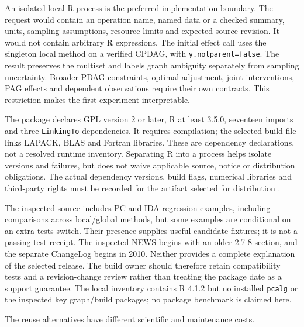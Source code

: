 An isolated local R process is the preferred implementation boundary.
The request would contain an operation name, named data or a checked
summary, units, sampling assumptions, resource limits and expected
source revision. It would not contain arbitrary R expressions. The
initial effect call uses the singleton local method on a verified CPDAG,
with \texttt{y.notparent=false}. The result preserves the multiset and
labels graph ambiguity separately from sampling uncertainty. Broader
PDAG constraints, optimal adjustment, joint interventions, PAG effects
and dependent observations require their own contracts. This restriction
makes the first experiment interpretable.

The package declares GPL version 2 or later, R at least 3.5.0, seventeen
imports and three \texttt{LinkingTo} dependencies. It requires
compilation; the selected build file links LAPACK, BLAS and Fortran
libraries. These are dependency declarations, not a resolved runtime
inventory. Separating R into a process helps isolate versions and
failures, but does not waive applicable source, notice or distribution
obligations. The actual dependency versions, build flags, numerical
libraries and third-party rights must be recorded for the artifact
selected for distribution \citep{exec13_pcalg_reuse_primary}.

The inspected source includes PC and IDA regression examples, including
comparisons across local/global methods, but some examples are
conditional on an extra-tests switch. Their presence supplies useful
candidate fixtures; it is not a passing test receipt. The inspected NEWS
begins with an older 2.7-8 section, and the separate ChangeLog begins in
2010. Neither provides a complete explanation of the selected release.
The build owner should therefore retain compatibility tests and a
revision-change review rather than treating the package date as a
support guarantee. The local inventory contains R 4.1.2 but no installed
\texttt{pcalg} or the inspected key graph/build packages; no package
benchmark is claimed here.

The reuse alternatives have different scientific and maintenance costs.

